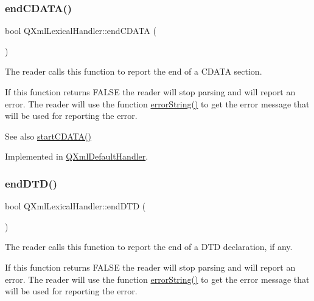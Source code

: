 \subsubsection{\texorpdfstring{endCDATA()}{endCDATA()}}
{\footnotesize\ttfamily bool Q\+Xml\+Lexical\+Handler\+::end\+C\+D\+A\+TA (\begin{DoxyParamCaption}{ }\end{DoxyParamCaption})\hspace{0.3cm}{\ttfamily [pure virtual]}}

The reader calls this function to report the end of a C\+D\+A\+TA section.

If this function returns F\+A\+L\+SE the reader will stop parsing and will report an error. The reader will use the function \mbox{\hyperlink{class_q_xml_lexical_handler_a2b1fdd6448b6a07b2af197fd3aca60d3}{error\+String()}} to get the error message that will be used for reporting the error.

\begin{DoxySeeAlso}{See also}
\mbox{\hyperlink{class_q_xml_lexical_handler_a64c691b5eeae5af0230d5fad46be2df2}{start\+C\+D\+A\+T\+A()}} 
\end{DoxySeeAlso}


Implemented in \mbox{\hyperlink{class_q_xml_default_handler_abd9e489248fd5df14d69ad0acf16aa80}{Q\+Xml\+Default\+Handler}}.

\mbox{\label{class_q_xml_lexical_handler_a7f5188d7a0a54b6c276c5e7e2faa72bc}} 
\subsubsection{\texorpdfstring{endDTD()}{endDTD()}}
{\footnotesize\ttfamily bool Q\+Xml\+Lexical\+Handler\+::end\+D\+TD (\begin{DoxyParamCaption}{ }\end{DoxyParamCaption})\hspace{0.3cm}{\ttfamily [pure virtual]}}

The reader calls this function to report the end of a D\+TD declaration, if any.

If this function returns F\+A\+L\+SE the reader will stop parsing and will report an error. The reader will use the function \mbox{\hyperlink{class_q_xml_lexical_handler_a2b1fdd6448b6a07b2af197fd3aca60d3}{error\+String()}} to get the error message that will be used for reporting the error.

